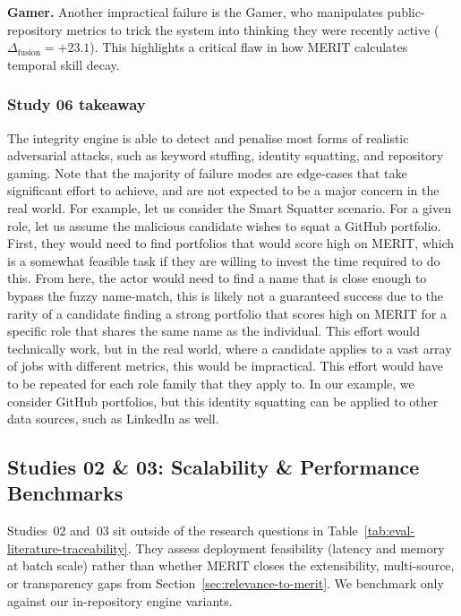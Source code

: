 \textbf{Gamer.} Another impractical failure is the Gamer, who manipulates public-repository metrics to trick the system into thinking they were recently active ($\Delta_{\mathrm{fusion}} = +23.1$). This highlights a critical flaw in how MERIT calculates temporal skill decay.


\subsubsection{Study 06 takeaway}
The integrity engine is able to detect and penalise most forms of realistic adversarial attacks, such as keyword stuffing, identity squatting, and repository gaming.
Note that the majority of failure modes are edge-cases that take significant effort to achieve, and are not expected to be a major concern in the real world.
For example, let us consider the Smart Squatter scenario. For a given role, let us assume the malicious candidate wishes to squat a GitHub portfolio. First,
they would need to find portfolios that would score high on MERIT, which is a somewhat feasible task if they are willing to invest the time required to do this.
From here, the actor would need to find a name that is close enough to bypass the fuzzy name-match, this is likely not a guaranteed success due to the rarity of
a candidate finding a strong portfolio that scores high on MERIT for a specific role that shares the same name as the individual. This effort would technically work, 
but in the real world, where a candidate applies to a vast array of jobs with different metrics, this would be impractical. This effort would have to be repeated for
each role family that they apply to. In our example, we consider GitHub portfolios, but this identity squatting can be applied to other data sources, such as LinkedIn as well.

\subsection{Studies 02 \& 03: Scalability \& Performance Benchmarks}
\label{subsec:studies-02-03-scalability}

Studies~02 and~03 sit outside of the research questions in Table~\ref{tab:eval-literature-traceability}. They 
assess deployment feasibility (latency and memory at batch scale) rather than whether MERIT closes the extensibility, multi-source, 
or transparency gaps from Section~\ref{sec:relevance-to-merit}.
We benchmark only against our in-repository engine variants.


